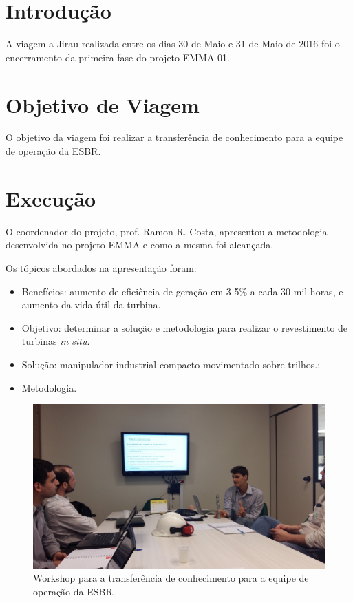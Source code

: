 \documentclass[a4paper,11pt,oneside,openany,brazilian,version=last,draft=false,]{main}
\begin{document}

\begin{twocolumn}

\section{Introdução}
A viagem a Jirau realizada entre os dias 30 de Maio e 31 de Maio de 2016 foi o
encerramento da primeira fase do projeto EMMA 01. 

\section{Objetivo de Viagem}
O objetivo da viagem foi
realizar a transferência de conhecimento para a equipe de operação da ESBR.


\section{Execução}
O coordenador do projeto, prof. Ramon R. Costa, apresentou a metodologia
desenvolvida no projeto EMMA e como a mesma foi alcançada.

Os tópicos abordados na apresentação foram:
\begin{itemize}
  \item Benefícios: aumento de eficiência de geração em 3-5\% a cada 30 mil
  horas, e aumento da vida útil da turbina.
  \item Objetivo: determinar a solução e metodologia para realizar o
revestimento de turbinas \textit{in situ}.
  \item Solução: manipulador industrial compacto movimentado sobre trilhos.;
  \item Metodologia.
\end{itemize}

\begin{figure}[H]
\centering
\includegraphics[width=\columnwidth]{20160530_154107}
\caption{Workshop para a transferência de conhecimento para a equipe de operação
da ESBR.}


\end{figure}
\end{twocolumn}
\end{document}
